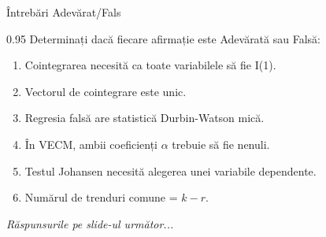 \documentclass[9pt, aspectratio=169, t]{beamer}
\begin{document}
\begin{frame}{Întrebări Adevărat/Fals}
    \begin{cminipage}{0.95\textwidth}
    Determinați dacă fiecare afirmație este Adevărată sau Falsă:

    \vspace{0.3cm}
    \begin{enumerate}\setlength{\itemsep}{0pt}
        \item Cointegrarea necesită ca toate variabilele să fie I(1).
        \item Vectorul de cointegrare este unic.
        \item Regresia falsă are statistică Durbin-Watson mică.
        \item În VECM, ambii coeficienți $\alpha$ trebuie să fie nenuli.
        \item Testul Johansen necesită alegerea unei variabile dependente.
        \item Numărul de trenduri comune = $k - r$.
    \end{enumerate}

    \vspace{0.3cm}
    \begin{flushright}\textit{Răspunsurile pe slide-ul următor...}\end{flushright}
    \end{cminipage}
\end{frame}
\end{document}

